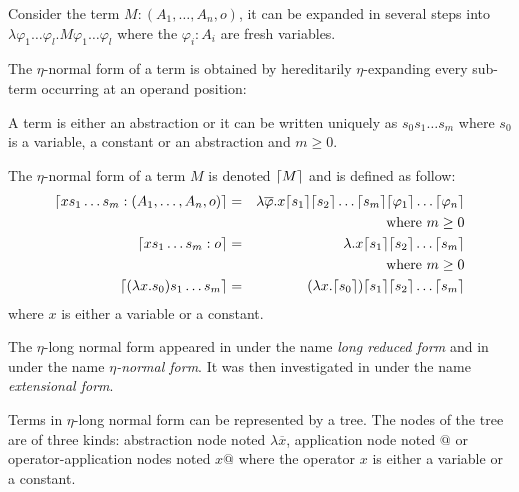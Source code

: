 Consider the term $M : (A_1,\ldots,A_n,o)$, it can be expanded in several steps into
$\lambda \varphi_1 \ldots \varphi_l . M \varphi_1 \ldots \varphi_l$
where the $\varphi_i:A_i$ are fresh variables.

The $\eta$-normal form of a term is obtained by hereditarily $\eta$-expanding every sub-term occurring
at an operand position:

\begin{dfn}
A term is either an abstraction or it can be written uniquely as $s_0 s_1 \ldots s_m$ where $s_0$ is a variable, a constant
or an abstraction and $m\geq0$.

The $\eta$-normal form of a term $M$ is denoted $\lceil M\rceil$ and is defined as follow:
\begin{eqnarray*}
\lceil x s_1 \ldots s_m : (A_1,\ldots,A_n,o)\rceil &=& \lambda \overline{\varphi} . x \lceil s_1\rceil \lceil s_2\rceil \ldots \lceil s_m\rceil \lceil \varphi_1\rceil \ldots \lceil \varphi_n\rceil \\
&& \mbox{where } m \geq 0 \\
\lceil x s_1 \ldots s_m : o\rceil &=& \lambda . x \lceil s_1\rceil \lceil s_2\rceil \ldots \lceil s_m\rceil \\
&& \mbox{where } m \geq 0 \\
\lceil (\lambda x . s_0) s_1 \ldots s_m \rceil &=& (\lambda x . \lceil s_0\rceil) \lceil s_1\rceil \lceil s_2\rceil \ldots \lceil s_m\rceil
\end{eqnarray*}
where $x$ is either a variable or a constant.
\end{dfn}

The $\eta$-long normal form appeared in \citep{DBLP:journals/tcs/JensenP76}
under the name \emph{long reduced form}
and in \citep{DBLP:journals/tcs/Huet75}
under the name \emph{$\eta$-normal form}. It was then investigated in \citep{huet76}
under the name \emph{extensional form}.



Terms in $\eta$-long normal form can be represented by a tree. The nodes
of the tree are of three kinds: abstraction node noted $\lambda \overline{x}$,
application node noted $@$ or operator-application nodes noted $x @$ where the operator $x$
 is either a variable or a constant.

